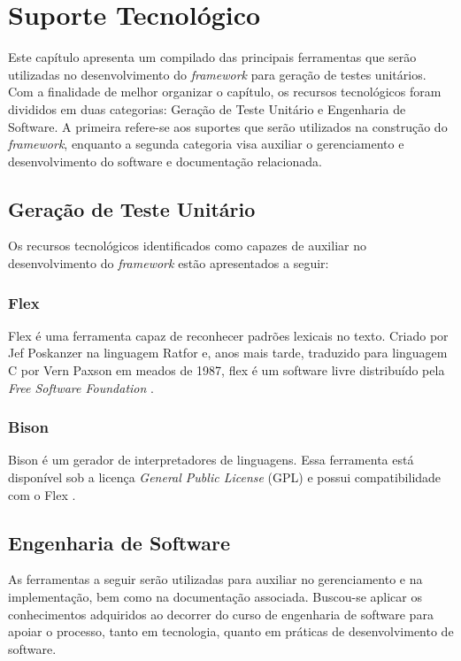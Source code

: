 \chapter[Suporte Tecnológico]{Suporte Tecnológico}

Este capítulo apresenta um compilado das principais ferramentas que serão utilizadas no desenvolvimento do \textit{framework} para geração de testes unitários. Com a finalidade de melhor organizar o capítulo, os recursos tecnológicos foram divididos em duas categorias: Geração de Teste Unitário e Engenharia de Software. A primeira refere-se aos suportes que serão utilizados na construção do \textit{framework}, enquanto a segunda categoria visa auxiliar o gerenciamento e desenvolvimento do software e documentação relacionada.

\section{Geração de Teste Unitário}

Os recursos tecnológicos identificados como capazes de auxiliar no desenvolvimento do \textit{framework} estão apresentados a seguir:

\subsection{Flex}
Flex é uma ferramenta capaz de reconhecer padrões lexicais no texto. Criado por Jef Poskanzer na linguagem Ratfor e, anos mais tarde, traduzido para linguagem C por Vern Paxson em meados de 1987, flex é um software livre distribuído pela \textit{Free Software Foundation} \cite{flex2008}.

\subsection{Bison}
Bison é um gerador de interpretadores de linguagens. Essa ferramenta está disponível sob a licença \textit{General Public License} (GPL) e possui compatibilidade com o Flex \cite{bison2014}.

\section{Engenharia de Software}

As ferramentas a seguir serão utilizadas para auxiliar no gerenciamento e na implementação, bem como na documentação associada. Buscou-se aplicar os conhecimentos adquiridos ao decorrer do curso de engenharia de software para apoiar o processo, tanto em tecnologia, quanto em práticas de desenvolvimento de software.

